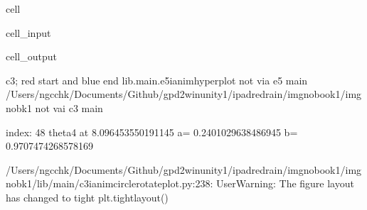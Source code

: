 \documentclass[letterpaper,10pt,english]{jupyterBook}
\begin{document}
\begin{sphinxuseclass}{cell}\begin{sphinxVerbatimInput}

\begin{sphinxuseclass}{cell_input}
\begin{sphinxVerbatim}[commandchars=\\\{\}]
 
 
   
\end{sphinxVerbatim}

\end{sphinxuseclass}\end{sphinxVerbatimInput}
\begin{sphinxVerbatimOutput}

\begin{sphinxuseclass}{cell_output}
\begin{sphinxVerbatim}[commandchars=\\\{\}]
c3; red start and blue end
lib.main.e5\PYGZus{}i\PYGZus{}anim\PYGZus{}hyperplot
not via e5 main
/Users/ngcchk/Documents/Github/gpd2\PYGZhy{}win\PYGZhy{}unity1/ipadred\PYGZhy{}rain/imgno\PYGZus{}book1/imgnobk1
not vai c3 main

index: 48 
theta4 at  8.096453550191145 
 a= \PYGZhy{}0.2401029638486945  b= 0.9707474268578169 
\end{sphinxVerbatim}

\begin{sphinxVerbatim}[commandchars=\\\{\}]
/Users/ngcchk/Documents/Github/gpd2\PYGZhy{}win\PYGZhy{}unity1/ipadred\PYGZhy{}rain/imgno\PYGZus{}book1/imgnobk1/lib/main/c3\PYGZus{}i\PYGZus{}anim\PYGZus{}circle\PYGZus{}rotate\PYGZus{}plot.py:238: UserWarning: The figure layout has changed to tight
  plt.tight\PYGZus{}layout()
\end{sphinxVerbatim}

\noindent{}

\end{sphinxuseclass}\end{sphinxVerbatimOutput}

\end{sphinxuseclass}
\end{document}
